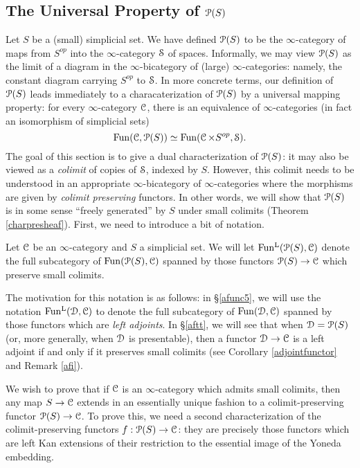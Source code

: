 \subsection{The Universal Property of $\operatorname{\mathcal{P}}(S)$}\label{presheaf4}

Let $S$ be a (small) simplicial set. We have defined $\operatorname{\mathcal{P}}(S)$ to be the $\infty$-category of maps from $S^{op}$ into the $\infty$-category $\operatorname{\mathcal{S}}$ of spaces. Informally, we may view $\operatorname{\mathcal{P}}(S)$ as the limit of a diagram in the $\infty$-bicategory of (large) $\infty$-categories: namely, the constant diagram carrying $S^{op}$ to $\operatorname{\mathcal{S}}$. In more concrete terms, our definition of $\operatorname{\mathcal{P}}(S)$ leads immediately to a characaterization of $\operatorname{\mathcal{P}}(S)$ by a universal mapping property: for every $\infty$-category $\operatorname{\mathcal{C}}$, there is an equivalence of $\infty$-categories (in fact an isomorphism of simplicial sets)
$$ \operatorname{Fun}(\operatorname{\mathcal{C}}, \operatorname{\mathcal{P}}(S)) \simeq \operatorname{Fun}(\operatorname{\mathcal{C}} \times S^{op}, \operatorname{\mathcal{S}}).$$
The goal of this section is to give a dual characterization of $\operatorname{\mathcal{P}}(S)$: it may also be viewed
as a {\em colimit} of copies of $\operatorname{\mathcal{S}}$, indexed by $S$. However, this colimit needs to be understood in an appropriate $\infty$-bicategory of $\infty$-categories where the morphisms are given by {\em colimit preserving} functors. In other words, we will show that $\operatorname{\mathcal{P}}(S)$ is in some sense ``freely generated'' by $S$ under small colimits (Theorem \ref{charpresheaf}). First, we need to introduce a bit of notation.

\begin{notation}
Let $\operatorname{\mathcal{C}}$ be an $\infty$-category and $S$ a simplicial set. We will let
$\operatorname{Fun^{L}}( \operatorname{\mathcal{P}}(S), \operatorname{\mathcal{C}})$ denote the full subcategory of
$\operatorname{Fun}( \operatorname{\mathcal{P}}(S), \operatorname{\mathcal{C}})$ spanned by those functors $\operatorname{\mathcal{P}}(S) \rightarrow \operatorname{\mathcal{C}}$
which preserve small colimits. 

The motivation for this notation is as follows: in \S \ref{afunc5}, we will use the notation
$\operatorname{Fun^{L}}( \operatorname{\mathcal{D}}, \operatorname{\mathcal{C}})$ to denote the full subcategory of $\operatorname{Fun}( \operatorname{\mathcal{D}}, \operatorname{\mathcal{C}})$ spanned by those functors which are {\em left adjoints}. In \S \ref{aftt}, we will see that when $\operatorname{\mathcal{D}} = \operatorname{\mathcal{P}}(S)$ (or, more generally, when $\operatorname{\mathcal{D}}$ is presentable), then a functor $\operatorname{\mathcal{D}} \rightarrow \operatorname{\mathcal{C}}$ is a left adjoint if and only if it preserves small colimits (see Corollary \ref{adjointfunctor} and Remark \ref{afi}). 
\end{notation}

We wish to prove that if $\operatorname{\mathcal{C}}$ is an $\infty$-category which admits small colimits, then any map $S \rightarrow \operatorname{\mathcal{C}}$ extends in an essentially unique fashion to a colimit-preserving functor $\operatorname{\mathcal{P}}(S) \rightarrow \operatorname{\mathcal{C}}$. To prove this, we need a second characterization of the colimit-preserving functors $f: \operatorname{\mathcal{P}}(S) \rightarrow \operatorname{\mathcal{C}}$: they are precisely those functors which are left Kan extensions of their restriction to the essential image of the Yoneda embedding.

